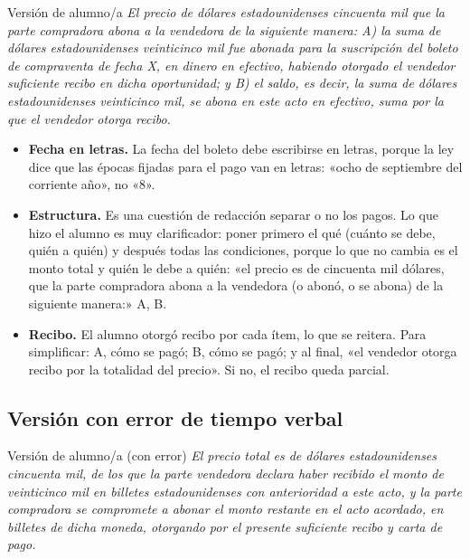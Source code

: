 \documentclass[12pt,oneside]{book}
\begin{document}
\begin{example}{Versión de alumno/a}
\textit{El precio de dólares estadounidenses cincuenta mil que la parte compradora abona a la vendedora de la siguiente manera: A) la suma de dólares estadounidenses veinticinco mil fue abonada para la suscripción del boleto de compraventa de fecha X, en dinero en efectivo, habiendo otorgado el vendedor suficiente recibo en dicha oportunidad; y B) el saldo, es decir, la suma de dólares estadounidenses veinticinco mil, se abona en este acto en efectivo, suma por la que el vendedor otorga recibo.}
\end{example}

\begin{itemize}
    \item \textbf{Fecha en letras.} La fecha del boleto debe escribirse en letras, porque la ley dice que las épocas fijadas para el pago van en letras: «ocho de septiembre del corriente año», no «8».
    \item \textbf{Estructura.} Es una cuestión de redacción separar o no los pagos. Lo que hizo el alumno es muy clarificador: poner primero el qué (cuánto se debe, quién a quién) y después todas las condiciones, porque lo que no cambia es el monto total y quién le debe a quién: «el precio es de cincuenta mil dólares, que la parte compradora abona a la vendedora (o abonó, o se abona) de la siguiente manera:» A, B.
    \item \textbf{Recibo.} El alumno otorgó recibo por cada ítem, lo que se reitera. Para simplificar: A, cómo se pagó; B, cómo se pagó; y al final, «el vendedor otorga recibo por la totalidad del precio». Si no, el recibo queda parcial.
\end{itemize}

\subsection{Versión con error de tiempo verbal}

\begin{example}{Versión de alumno/a (con error)}
\textit{El precio total es de dólares estadounidenses cincuenta mil, de los que la parte vendedora declara haber recibido el monto de veinticinco mil en billetes estadounidenses con anterioridad a este acto, y la parte compradora se compromete a abonar el monto restante en el acto acordado, en billetes de dicha moneda, otorgando por el presente suficiente recibo y carta de pago.}
\end{example}
\end{document}
